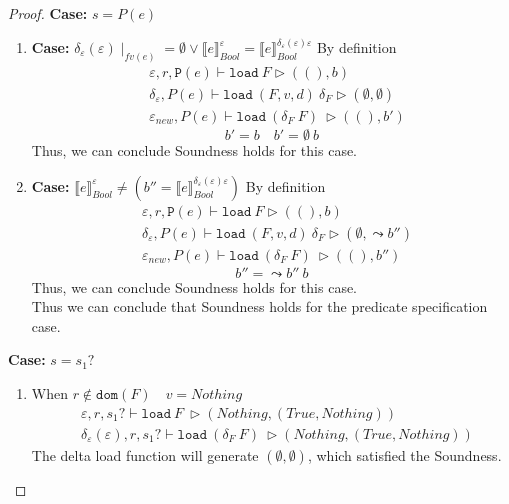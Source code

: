 \documentclass[10pt,twoside,a4paper]{article}
\theoremstyle{theorem}
\theoremstyle{lemma}
\theoremstyle{property}
\theoremstyle{definition}
\theoremstyle{assumption}
\def\newenv{\delta_\varepsilon(\varepsilon)}
\begin{document}
\begin{proof}
	\textbf{Case: } $s = P(e)$\\
	\begin{enumerate}
	\item
	\textbf{Case: } $\delta_\varepsilon(\varepsilon) \mid_{fv(e)} = \emptyset \lor \llbracket e \rrbracket^{\varepsilon}_{Bool} = \llbracket e \rrbracket^{\delta_\varepsilon(\varepsilon) \varepsilon}_{Bool}$
	By definition
	\begin{align*}
		& \varepsilon, r, \mathtt{P}(e) \vdash \mathtt{load}~F \rhd ((),b)\\
		& \delta_\varepsilon, P(e) \vdash \mathtt{load}~ (F,v,d)~ \delta_F \rhd (\emptyset, \emptyset)\\
		& \varepsilon_{new}, P(e) \vdash \mathtt{load}~ (\delta_F~F)~ \rhd ((),b')
	\end{align*}
	\begin{displaymath}
		b' = b \quad b' = \emptyset ~b
	\end{displaymath}
	Thus, we can conclude Soundness holds for this case.

	\item
	\textbf{Case: } $\llbracket e \rrbracket^{\varepsilon}_{Bool} \not= ( b'' = \llbracket e \rrbracket^{\delta_\varepsilon(\varepsilon) \varepsilon}_{Bool})$
	By definition
	\begin{align*}
		& \varepsilon, r, \mathtt{P}(e) \vdash \mathtt{load}~F \rhd ((),b)\\
		& \delta_\varepsilon, P(e) \vdash \mathtt{load}~ (F,v,d)~ \delta_F \rhd (\emptyset, \leadsto b'')\\
		& \varepsilon_{new}, P(e) \vdash \mathtt{load}~ (\delta_F~F)~ \rhd ((),b'')
	\end{align*}
	\begin{displaymath}
		b'' = \leadsto b'' ~b
	\end{displaymath}
	Thus, we can conclude Soundness holds for this case.\\
	Thus we can conclude that Soundness holds for the predicate specification case.
	\end{enumerate}

	\textbf{Case: } $s = s_1?$\\
	\begin{enumerate}
	\item
	When $r \notin \mathtt{dom}(F) \quad v = Nothing$
	\begin{align*}
		& \varepsilon, r, s_1? \vdash \mathtt{load}~ F~ \rhd (Nothing,(True, Nothing))\\
		& \newenv, r, s_1? \vdash \mathtt{load}~ (\delta_F~F)~ \rhd (Nothing,(True, Nothing))
	\end{align*}
	The delta load function will generate $(\emptyset, \emptyset)$, which satisfied the Soundness.


\end{enumerate}
\end{proof}
\end{document}
